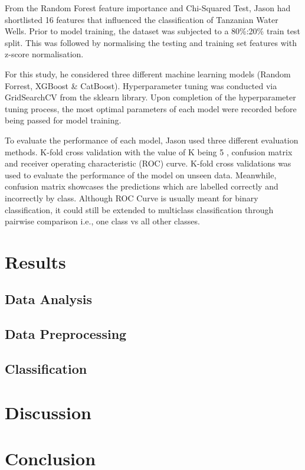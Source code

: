\documentclass[conference]{IEEEtran}
\begin{document}
From the Random Forest feature importance and Chi-Squared Test, Jason had shortlisted 16 features that influenced the classification of Tanzanian Water Wells. Prior to model training, the dataset was subjected to a 80\%:20\% train test split. This was followed by normalising the testing and training set features with z-score normalisation.

For this study, he considered three different machine learning models  (Random Forrest, XGBoost \& CatBoost). Hyperparameter tuning was conducted via GridSearchCV \cite{gridsearch} from the sklearn library. Upon completion of the hyperparameter tuning process, the most optimal parameters of each model were recorded before being passed for model training. 

To evaluate the performance of each model, Jason used three different evaluation methods. K-fold cross validation with the value of K being 5 , confusion matrix and receiver operating characteristic (ROC) curve. K-fold cross validations was used to evaluate the performance of the model on unseen data. Meanwhile, confusion matrix showcases the predictions which are labelled correctly and incorrectly by class. Although ROC Curve is usually meant for binary classification, it could still be extended to multiclass classification through pairwise comparison i.e., one class vs all other classes.   

\section{Results} \label{ref:results}

\subsection{Data Analysis}

\subsection{Data Preprocessing}

\subsection{Classification}

\section{Discussion}

\section{Conclusion}



\end{document}
